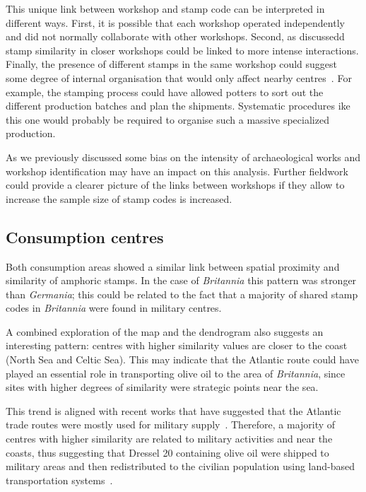 This unique link between workshop and stamp code can be interpreted in different ways. First, it is possible that each workshop operated independently and did not normally collaborate with other workshops. Second, as discussedd stamp similarity in closer workshops could be linked to more intense interactions. Finally, the presence of different stamps in the same workshop could suggest some degree of internal organisation that would only affect nearby centres~\citep[104]{juanmorostesis}. For example, the stamping process could have allowed potters to sort out the different production batches and plan the shipments. Systematic procedures ike this one would probably be required to organise such a massive specialized production.

As we previously discussed some bias on the intensity of archaeological works and workshop identification may have an impact on this analysis. Further fieldwork could provide a clearer picture of the links between workshops if they allow to increase the sample size of stamp codes is increased.

\subsection{Consumption centres}
\label{sec:7}

Both consumption areas showed a similar link between spatial proximity and similarity of amphoric stamps. In the case of  \textit{Britannia} this pattern was stronger than \textit{Germania}; this could be related to the fact that a majority of shared stamp codes in \textit{Britannia} were found in military centres.  

A combined exploration of the map and the dendrogram also suggests an interesting pattern: centres with higher similarity values are closer to the coast (North Sea and Celtic Sea). This may indicate that the Atlantic route could have played an essential role in transporting olive oil to the area of \textit{Britannia}, since sites with higher degrees of similarity were strategic points near the sea.

This trend is aligned with recent works that have suggested that the Atlantic trade routes were mostly used for military supply~\citep{remesal_annona_1986,remesal_provincial_2008,carreras_atlantic_2012,morillo_hispania_2016}. Therefore, a majority of centres with higher similarity are related to military activities and near the coasts, thus suggesting that Dressel 20 containing olive oil were shipped to military areas and then redistributed to the civilian population using land-based transportation systems~\citep{carreras_britannia_1998,orengo_seeds_2016,ayllon_olive_2018}.
 
